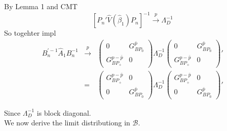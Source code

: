 \documentclass[11pt, fleqn]{article}
\begin{document}
 By Lemma 1 and CMT
 \begin{equation}
 \left[P_n'\hat{V}(\hat{\beta}_1)P_n\right]^{-1} \overset{p}{\rightarrow}\Lambda_D^{-1}
 \end{equation}
 So togehter impl
 \begin{eqnarray}B_n^{'-1}\hat{A}_1 B_n^{-1}
 &\overset{p}{\rightarrow}&
   \left(\begin{array}{cc} 0 &  G_{BP_0}^{\bar{p}}\\
   G_{BP_+}^{p-\bar{p}}& 0
   \end{array} \right)\Lambda_D^{-1}   \left(\begin{array}{cc} 0 &  G_{BP_0}^{\bar{p}}\\
   G_{BP_+}^{p-\bar{p}}& 0
   \end{array} \right)'\\
   &=& \left(\begin{array}{cc}  G_{BP_+}^{p-\bar{p}} &  0\\
  0& G_{BP_0}^{\bar{p}}
   \end{array} \right)\Lambda_D^{-1}   \left(\begin{array}{cc}  G_{BP_+}^{p-\bar{p}} &  0\\
   0& G_{BP_0}^{\bar{p}}
   \end{array} \right)'
   \end{eqnarray}
   
  Since $\Lambda_D^{-1}$ is block diagonal.\\
  
  We now derive the limit distributiong in $\mathcal{B}$.
  
\end{document}
